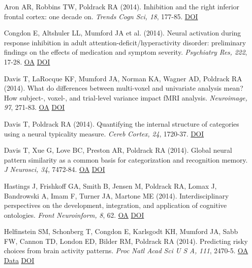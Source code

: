 \documentclass[10pt, letterpaper]{article}
\begin{document}
Aron AR, Robbins TW, Poldrack RA (2014). Inhibition and the right inferior frontal cortex: one decade on. \textit{Trends Cogn Sci, 18}, 177-85. \href{http://dx.doi.org/10.1016/j.tics.2013.12.003}{DOI} \vspace{2mm}

Congdon E, Altshuler LL, Mumford JA et al. (2014). Neural activation during response inhibition in adult attention-deficit/hyperactivity disorder: preliminary findings on the effects of medication and symptom severity. \textit{Psychiatry Res, 222}, 17-28. \href{https://www.ncbi.nlm.nih.gov/pmc/articles/PMC4009011}{OA} \href{http://dx.doi.org/10.1016/j.pscychresns.2014.02.002}{DOI} \vspace{2mm}

Davis T, LaRocque KF, Mumford JA, Norman KA, Wagner AD, Poldrack RA (2014). What do differences between multi-voxel and univariate analysis mean? How subject-, voxel-, and trial-level variance impact fMRI analysis. \textit{Neuroimage, 97}, 271-83. \href{https://www.ncbi.nlm.nih.gov/pmc/articles/PMC4115449}{OA} \href{http://dx.doi.org/10.1016/j.neuroimage.2014.04.037}{DOI} \vspace{2mm}

Davis T, Poldrack RA (2014). Quantifying the internal structure of categories using a neural typicality measure. \textit{Cereb Cortex, 24}, 1720-37. \href{http://dx.doi.org/10.1093/cercor/bht014}{DOI} \vspace{2mm}

Davis T, Xue G, Love BC, Preston AR, Poldrack RA (2014). Global neural pattern similarity as a common basis for categorization and recognition memory. \textit{J Neurosci, 34}, 7472-84. \href{https://www.ncbi.nlm.nih.gov/pmc/articles/PMC4035513}{OA} \href{http://dx.doi.org/10.1523/jneurosci.3376-13.2014}{DOI} \vspace{2mm}

Hastings J, Frishkoff GA, Smith B, Jensen M, Poldrack RA, Lomax J, Bandrowski A, Imam F, Turner JA, Martone ME (2014). Interdisciplinary perspectives on the development, integration, and application of cognitive ontologies. \textit{Front Neuroinform, 8}, 62. \href{https://www.ncbi.nlm.nih.gov/pmc/articles/PMC4064452}{OA} \href{http://dx.doi.org/10.3389/fninf.2014.00062}{DOI} \vspace{2mm}

Helfinstein SM, Schonberg T, Congdon E, Karlsgodt KH, Mumford JA, Sabb FW, Cannon TD, London ED, Bilder RM, Poldrack RA (2014). Predicting risky choices from brain activity patterns. \textit{Proc Natl Acad Sci U S A, 111}, 2470-5. \href{https://www.ncbi.nlm.nih.gov/pmc/articles/PMC3932884}{OA} \href{https://openneuro.org/datasets/ds000030/versions/1.0.0}{Data} \href{http://dx.doi.org/10.1073/pnas.1321728111}{DOI} \vspace{2mm}
\end{document}
